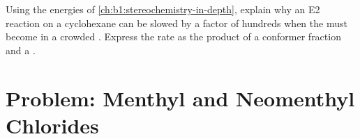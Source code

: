 \begin{exercise}[$\star\star\star$]\label{exo:b1:elimination:12}
Using the energies of \cref{ch:b1:stereochemistry-in-depth}, explain why
an E2 reaction on a cyclohexane can be slowed by a factor of hundreds
when the  must become  in a crowded . Express the
rate as the product of a conformer fraction and a .
\end{exercise}

\section{Problem: Menthyl and Neomenthyl Chlorides}

